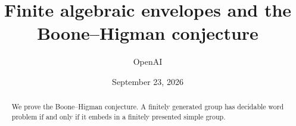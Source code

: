 \documentclass[11pt]{article}
\title{Finite algebraic envelopes and the Boone--Higman conjecture}
\author{OpenAI}
\date{September 23, 2026}
\theoremstyle{definition}
\theoremstyle{remark}
\begin{document}
\maketitle
\begin{abstract}
We prove the Boone--Higman conjecture. A finitely generated group has
decidable word problem if and only if it embeds in a finitely presented
simple group.
\end{abstract}
\tableofcontents







\appendix

\begingroup
\small
\raggedright
\setlength{\bibsep}{4pt}


\endgroup
\end{document}
